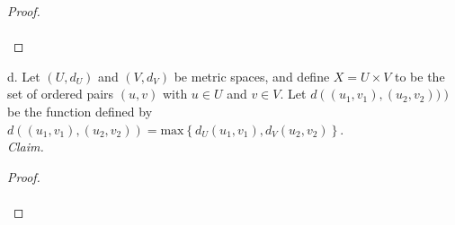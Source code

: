     \begin{proof}\renewcommand{\qedsymbol}{}\ \\\\
    \end{proof}

    \pagebreak

d.  Let $(U, d_U)$ and $(V, d_V)$ be metric spaces, and define $X = U \times V$
    to be the set of ordered pairs $(u, v)$ with $u \in U$ and $v \in V$.
    Let $d\left((u_1, v_1), (u_2, v_2))\right)$ be the function defined by
    $d\left((u_1, v_1), (u_2, v_2)\right) 
     = \text{max}\left\{d_U(u_1, v_1), d_V(u_2, v_2)\right\}$. \ \\
    
     \emph{Claim.} 
    \ \\

    \begin{proof}\renewcommand{\qedsymbol}{}\ \\\\
    \end{proof}

    \pagebreak